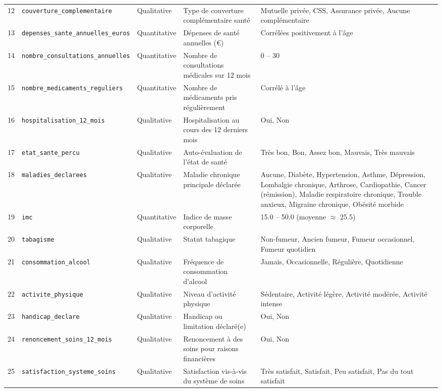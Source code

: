 \documentclass[11pt,a4paper]{memoirerecherche}
\begin{document}
\begin{longtable}{@{} c l l p{3.8cm} p{5.5cm} @{}}
12 & \texttt{couverture\_complementaire}     & Qualitative  & Type de couverture complémentaire santé              & Mutuelle privée, CSS, Assurance privée, Aucune complémentaire \\
13 & \texttt{depenses\_sante\_annuelles\_euros} & Quantitative & Dépenses de santé annuelles (€)                   & Corrélées positivement à l'âge \\
14 & \texttt{nombre\_consultations\_annuelles} & Quantitative & Nombre de consultations médicales sur 12 mois      & 0 -- 30 \\
15 & \texttt{nombre\_medicaments\_reguliers} & Quantitative & Nombre de médicaments pris régulièrement             & Corrélé à l'âge \\
16 & \texttt{hospitalisation\_12\_mois}      & Qualitative  & Hospitalisation au cours des 12 derniers mois        & Oui, Non \\
17 & \texttt{etat\_sante\_percu}             & Qualitative  & Auto-évaluation de l'état de santé                   & Très bon, Bon, Assez bon, Mauvais, Très mauvais \\
18 & \texttt{maladies\_declarees}            & Qualitative  & Maladie chronique principale déclarée                & Aucune, Diabète, Hypertension, Asthme, Dépression, Lombalgie chronique, Arthrose, Cardiopathie, Cancer (rémission), Maladie respiratoire chronique, Trouble anxieux, Migraine chronique, Obésité morbide \\
19 & \texttt{imc}                            & Quantitative & Indice de masse corporelle                           & 15.0 -- 50.0 (moyenne $\approx$ 25.5) \\
20 & \texttt{tabagisme}                      & Qualitative  & Statut tabagique                                     & Non-fumeur, Ancien fumeur, Fumeur occasionnel, Fumeur quotidien \\
21 & \texttt{consommation\_alcool}           & Qualitative  & Fréquence de consommation d'alcool                   & Jamais, Occasionnelle, Régulière, Quotidienne \\
22 & \texttt{activite\_physique}             & Qualitative  & Niveau d'activité physique                           & Sédentaire, Activité légère, Activité modérée, Activité intense \\
23 & \texttt{handicap\_declare}              & Qualitative  & Handicap ou limitation déclaré(e)                    & Oui, Non \\
24 & \texttt{renoncement\_soins\_12\_mois}   & Qualitative  & Renoncement à des soins pour raisons financières     & Oui, Non \\
25 & \texttt{satisfaction\_systeme\_soins}    & Qualitative  & Satisfaction vis-à-vis du système de soins           & Très satisfait, Satisfait, Peu satisfait, Pas du tout satisfait \\
\end{longtable}
\endgroup
\end{document}
